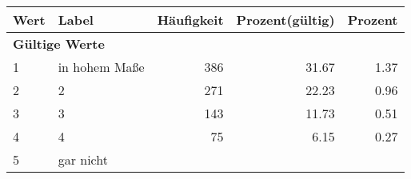     \begin{longtable}{lXrrr}
     \toprule
     \textbf{Wert} & \textbf{Label} & \textbf{Häufigkeit} & \textbf{Prozent(gültig)} & \textbf{Prozent} \\
     \endhead
     \midrule
     \multicolumn{5}{l}{\textbf{Gültige Werte}}\\

     1 &
     \multicolumn{1}{X}{ in hohem Maße   } &


       \num{386} &
       \num[round-mode=places,round-precision=2]{31,67} &
         \num[round-mode=places,round-precision=2]{1,37} \\

     2 &
     \multicolumn{1}{X}{ 2   } &


       \num{271} &
       \num[round-mode=places,round-precision=2]{22,23} &
         \num[round-mode=places,round-precision=2]{0,96} \\

     3 &
     \multicolumn{1}{X}{ 3   } &


       \num{143} &
       \num[round-mode=places,round-precision=2]{11,73} &
         \num[round-mode=places,round-precision=2]{0,51} \\

     4 &
     \multicolumn{1}{X}{ 4   } &


       \num{75} &
       \num[round-mode=places,round-precision=2]{6,15} &
         \num[round-mode=places,round-precision=2]{0,27} \\

     5 &
     \multicolumn{1}{X}{ gar nicht   } &



\end{longtable}
